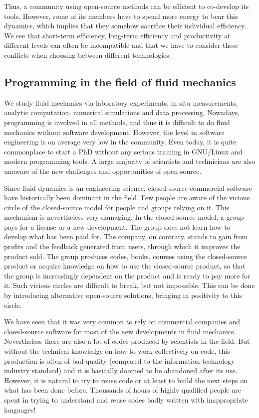 Thus, a community using open-source methods can be efficient to co-develop its
tools. However, some of its members have to spend more energy to bear this
dynamics, which implies that they somehow sacrifice their individual efficiency.
We see that short-term efficiency, long-term efficiency and productivity at
different levels can often be incompatible and that we have to consider these
conflicts when choosing between different technologies.

\subsection{Programming in the field of fluid mechanics}

We study fluid mechanics via laboratory experiments, in situ measurements,
analytic computation, numerical simulations and data processing.
%
Nowadays, programming is involved in all methods, and thus it is difficult to do
fluid mechanics without software development.
%
However, the level in software engineering is on average very low in the
community.
%
Even today, it is quite commonplace to start a PhD without any serious training in
GNU/Linux and modern programming tools.
%
A large majority of scientists and technicians are also unaware of the new
challenges and opportunities of open-source.

Since fluid dynamics is an engineering science, closed-source commercial software
have historically been dominant in the field.
%
Few people are aware of the vicious circle of the closed-source model for people
and groups relying on it.
%
This mechanism is nevertheless very damaging. In the closed-source model, a group
pays for a license or a new development. The group does not learn how to develop
what has been paid for. The company, on contrary, stands to gain from profits and
the feedback generated from users, through which it improves the product sold.
The group produces codes, books, courses using the closed-source product or
acquire knowledge on how to use the closed-source product, so that the group is
increasingly dependent on the product and is ready to pay more for it.
%
Such vicious circles are difficult to break, but not impossible. This can be
done by introducing alternative open-source solutions, bringing in positivity to
this circle.

We have seen that it was very common to rely on commercial companies and
closed-source software for most of the new developments in fluid mechanics.
%
Nevertheless there are also a lot of codes produced by scientists in the
field. But without the technical knowledge on how to work collectively on code,
this production is often of bad quality (compared to the information technology
industry standard) and it is basically doomed to be abandoned after its use.
%
However, it is natural to try to reuse code or at least to build the next steps
on what has been done before.  Thousands of hours of highly qualified people
are spent in trying to understand and reuse codes badly written with
inappropriate languages!

